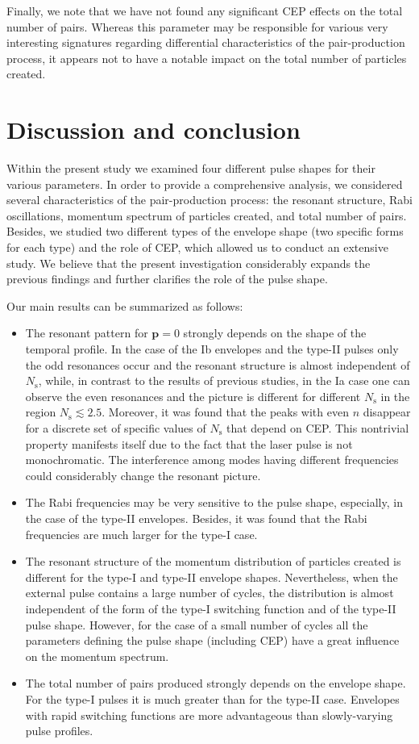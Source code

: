 \documentclass[preprint,aps,prd,showpacs,floatfix]{revtex4-1}
\begin{document}
\indent Finally, we note that we have not found any significant CEP effects on the total number of pairs. Whereas this parameter may be responsible for various very interesting signatures regarding differential characteristics of the pair-production process, it appears not to have a notable impact on the total number of particles created.
\section{Discussion and conclusion}\label{sec:discussion}
%
Within the present study we examined four different pulse shapes for their various parameters. In order to provide a comprehensive analysis, we considered several characteristics of the pair-production process: the resonant structure, Rabi oscillations, momentum spectrum of particles created, and total number of pairs. Besides, we studied two different types of the envelope shape (two specific forms for each type) and the role of CEP, which allowed us to conduct an extensive study. We believe that the present investigation considerably expands the previous findings and further clarifies the role of the pulse shape.

\indent Our main results can be summarized as follows:
%
\begin{itemize}
\item The resonant pattern for $\boldsymbol{p} = 0$ strongly depends on the shape of the temporal profile. In the case of the Ib envelopes and the type-II pulses only the odd resonances occur and the resonant structure is almost independent of $N_\text{s}$, while, in contrast to the results of previous studies, in the Ia case one can observe the even resonances and the picture is different for different $N_\text{s}$ in the region $N_\text{s} \lesssim 2.5$. Moreover, it was found that the peaks with even $n$ disappear for a discrete set of specific values of $N_\text{s}$ that depend on CEP. This nontrivial property manifests itself due to the fact that the laser pulse is not monochromatic. The interference among modes having different frequencies could considerably change the resonant picture.
\item The Rabi frequencies may be very sensitive to the pulse shape, especially, in the case of the type-II envelopes. Besides, it was found that the Rabi frequencies are much larger for the type-I case. 
\item The resonant structure of the momentum distribution of particles created is different for the type-I and type-II envelope shapes. Nevertheless, when the external pulse contains a large number of cycles, the distribution is almost independent of the form of the type-I switching function and of the type-II pulse shape. However, for the case of a small number of cycles all the parameters defining the pulse shape (including CEP) have a great influence on the momentum spectrum.
\item The total number of pairs produced strongly depends on the envelope shape. For the type-I pulses it is much greater than for the type-II case. Envelopes with rapid switching functions are more advantageous than slowly-varying pulse profiles.
\end{itemize}
\end{document}
